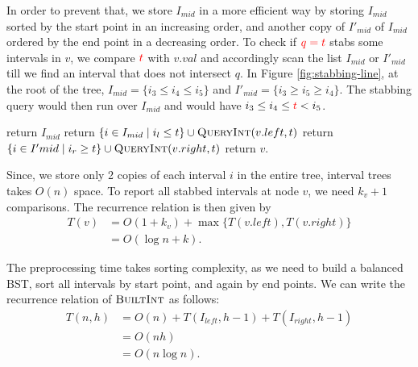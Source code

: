 In order to prevent that, we store $I_{mid}$ in a more efficient way by storing $I_{mid}$ sorted by the start point in an increasing order, and another copy of $I'_{mid}$ of $I_{mid}$ ordered by the end point in a decreasing order.
%
To check if $\textcolor{red}{q = t}$ stabs some intervals in $v$, we compare $\textcolor{red}{t} $ with $v.val$ and accordingly scan the list $I_{mid}$ or $I'_{mid}$ till we find an interval that does not intersect $q$.
%  
In Figure \ref{fig:stabbing-line}, at the root of the tree, $I_{mid} = \{ i_3 \leq  i_4 \leq i_5 \} $ and $I'_{mid} = \{ i_3 \geq  i_5 \geq i_4 \}$. 
%
The stabbing query would then run over $I_{mid}$ and would have $i_3 \leq i_4 \leq \textcolor{red}{t} < i_5$.  

\begin{algorithm}[H]
    \caption{} 
    \label{alg:build-interval}
    \begin{algorithmic}[1]
        		return $I_{mid}$
        	\EndIf
        		\State return $ \{ i \in I_{mid} \mid i_l \leq t \}  \cup \textsc{QueryInt}(v.left, t)$
       		\Else 
       			\State return $\{ i \in I'{mid} \mid  i_r \geq t\} \cup \textsc{QueryInt}(v.right, t)$
        	\EndIf
          \State return $v$.
        \EndFunction
    \end{algorithmic}
\end{algorithm}

Since, we store only 2 copies of each interval $i$ in the entire tree, interval trees takes $O(n)$ space.
%
To report all stabbed intervals at node $v$, we need $k_v +1 $ comparisons. The recurrence relation is then given by
\begin{align*} 
T(v) &= O(1 + k_v) + \max \{T(v.left) , T(v.right) \}   \\
& = O(\log n + k).
\end{align*}

The preprocessing time takes sorting complexity, as we need to build a balanced BST, sort all intervals by start point, and again by end points. 
%
We can write the recurrence relation of $\textsc{BuiltInt}$ as follows:
\begin{align*}
	T(n, h) &= O(n) + T(I_{left}, h-1) + T (I_{right}, h-1) \\
	& = O(nh) \\
	&= O(n \log n).  
\end{align*}

